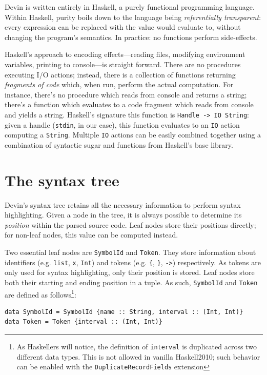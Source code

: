 \documentclass[11pt, american, draft]{PhdThesis}
\begin{document}
  Devin is written entirely in Haskell, a purely functional programming language. Within Haskell,
  purity boils down to the language being \emph{referentially transparent}: every expression can
  be replaced with the value would evaluate to, without changing the program's semantics. In
  practice: no functions perform side-effects.

  Haskell's approach to encoding effects---reading files, modifying environment variables, printing
  to console---is straight forward. There are no procedures executing I/O actions; instead, there
  is a collection of functions returning \emph{fragments of code} which, when run, perform the
  actual computation. For instance, there's no procedure which reads from console and returns a
  string; there's a function which evaluates to a code fragment which reads from console and yields
  a string. Haskell's signature this function is \verb$Handle -> IO String$: given a handle
  (\verb$stdin$, in our case), this function evaluates to an \verb$IO$ action computing a
  \verb$String$. Multiple \verb$IO$ actions can be easily combined together using a combination of
  syntactic sugar and functions from Haskell's base library.

  \section{The syntax tree}

  Devin's syntax tree retains all the necessary information to perform syntax highlighting. Given a
  node in the tree, it is always possible to determine its \emph{position} within the parsed source
  code. Leaf nodes store their positions directly; for non-leaf nodes, this value can be computed
  instead.

  Two essential leaf nodes are \verb$SymbolId$ and \verb$Token$. They store information about
  identifiers (e.g. \verb$list$, \verb$x$, \verb$Int$) and tokens (e.g. \verb${$, \verb$}$, \verb$->$)
  respectively. As tokens are only used for syntax highlighting, only their position is stored.
  Leaf nodes store both their starting and ending position in a tuple. As such, \verb$SymbolId$ and
  \verb$Token$ are defined as follows\footnote{As Haskellers will notice, the definition of
  \mbox{\texttt{interval}} is duplicated across two different data types. This is not allowed in
  vanilla Haskell2010; such behavior can be enabled with the \mbox{\texttt{DuplicateRecordFields}}
  extension}:

\begin{verbatim}
data SymbolId = SymbolId {name :: String, interval :: (Int, Int)}
data Token = Token {interval :: (Int, Int)}
\end{verbatim}
\end{document}
